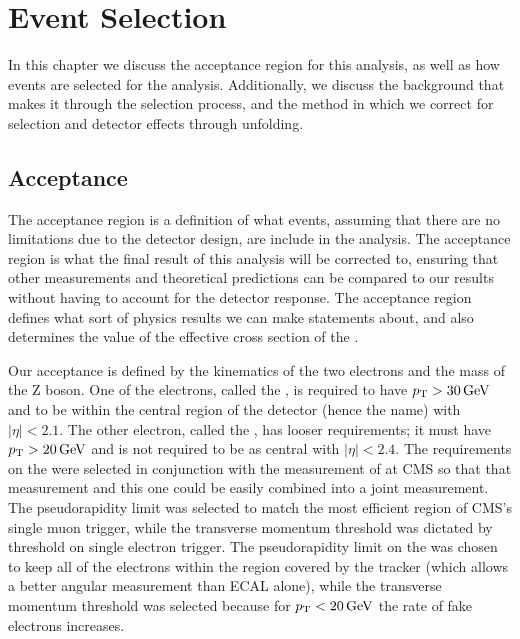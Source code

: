 \chapter{Event Selection}
\label{event_selection_chapter}

In this chapter we discuss the acceptance region for this analysis, as well as
how events are selected for the analysis. Additionally, we discuss the
background that makes it through the selection process, and the method in which
we correct for selection and detector effects through unfolding.

\section{Acceptance}
\label{sec:acceptance}

The acceptance region is a definition of what events, assuming that there are
no limitations due to the detector design, are include in the analysis. The
acceptance region is what the final result of this analysis will be corrected
to, ensuring that other measurements and theoretical predictions can be
compared to our results without having to account for the detector response.
The acceptance region defines what sort of physics results we can make
statements about, and also determines the value of the effective cross section
of the \Z.

Our acceptance is defined by the kinematics of the two electrons and the mass
of the Z boson. One of the electrons, called the \CentralElectron, is required
to have $p_{\mathrm{T}} > 30 \,\text{Ge\hspace{-.08em}V}$ and to be within the central region of the detector
(hence the name) with $|\eta| < 2.1$. The other electron, called the
\ExtendedElectron, has looser requirements; it must have $p_{\mathrm{T}} > 20 \,\text{Ge\hspace{-.08em}V}$ and is
not required to be as central with $|\eta| < 2.4$. The requirements on the
\CentralElectron were selected in conjunction with the \Ztomumu measurement of
\phistar at CMS so that that measurement and this one could be easily combined
into a joint measurement. The pseudorapidity limit was selected to match the
most efficient region of CMS's single muon trigger, while the transverse
momentum threshold was dictated by threshold on single electron trigger. The
pseudorapidity limit on the \ExtendedElectron was chosen to keep all of the
electrons within the region covered by the tracker (which allows a better
angular measurement than ECAL alone), while the transverse momentum threshold
was selected because for $p_{\mathrm{T}} < 20 \,\text{Ge\hspace{-.08em}V}$ the rate of fake electrons increases.

